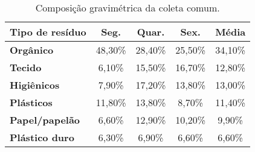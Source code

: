 \begin{table}[htbp]
\caption{Composição gravimétrica da coleta comum.}

\begin{center}
	\begin{tabular}{p{9.285em}|c|c|c|c}
	\rowcolor[rgb]{ .969,  .588,  .275} \textcolor[rgb]{ 1,  1,  1}{\textbf{Tipo de resíduo}} & \multicolumn{1}{p{4.215em}|}{\textcolor[rgb]{ 1,  1,  1}{\textbf{Seg.}}} & \multicolumn{1}{p{4.215em}|}{\textcolor[rgb]{ 1,  1,  1}{\textbf{Quar.}}} & \multicolumn{1}{p{4.215em}|}{\textcolor[rgb]{ 1,  1,  1}{\textbf{Sex.}}} & \multicolumn{1}{p{4.215em}|}{\textcolor[rgb]{ 1,  1,  1}{\textbf{Média}}} \\
	\midrule
	\rowcolor[rgb]{ .969,  .588,  .275} \textcolor[rgb]{ 1,  1,  1}{\textbf{Orgânico}} & \cellcolor[rgb]{ .984,  .831,  .706}48,30\% & \cellcolor[rgb]{ .984,  .831,  .706}28,40\% & \cellcolor[rgb]{ .984,  .831,  .706}25,50\% & \cellcolor[rgb]{ .984,  .831,  .706}34,10\% \\
	\midrule
	\rowcolor[rgb]{ .969,  .588,  .275} \textcolor[rgb]{ 1,  1,  1}{\textbf{Tecido}} & \cellcolor[rgb]{ .992,  .914,  .851}6,10\% & \cellcolor[rgb]{ .992,  .914,  .851}15,50\% & \cellcolor[rgb]{ .992,  .914,  .851}16,70\% & \cellcolor[rgb]{ .992,  .914,  .851}12,80\% \\
	\midrule
	\rowcolor[rgb]{ .969,  .588,  .275} \textcolor[rgb]{ 1,  1,  1}{\textbf{Higiênicos}} & \cellcolor[rgb]{ .984,  .831,  .706}7,90\% & \cellcolor[rgb]{ .984,  .831,  .706}17,20\% & \cellcolor[rgb]{ .984,  .831,  .706}13,80\% & \cellcolor[rgb]{ .984,  .831,  .706}13,00\% \\
	\midrule
	\rowcolor[rgb]{ .969,  .588,  .275} \textcolor[rgb]{ 1,  1,  1}{\textbf{Plásticos}} & \cellcolor[rgb]{ .992,  .914,  .851}11,80\% & \cellcolor[rgb]{ .992,  .914,  .851}13,80\% & \cellcolor[rgb]{ .992,  .914,  .851}8,70\% & \cellcolor[rgb]{ .992,  .914,  .851}11,40\% \\
	\midrule
	\rowcolor[rgb]{ .969,  .588,  .275} \textcolor[rgb]{ 1,  1,  1}{\textbf{Papel/papelão}} & \cellcolor[rgb]{ .984,  .831,  .706}6,60\% & \cellcolor[rgb]{ .984,  .831,  .706}12,90\% & \cellcolor[rgb]{ .984,  .831,  .706}10,20\% & \cellcolor[rgb]{ .984,  .831,  .706}9,90\% \\
	\midrule
	\rowcolor[rgb]{ .969,  .588,  .275} \textcolor[rgb]{ 1,  1,  1}{\textbf{Plástico duro}} & \cellcolor[rgb]{ .992,  .914,  .851}6,30\% & \cellcolor[rgb]{ .992,  .914,  .851}6,90\% & \cellcolor[rgb]{ .992,  .914,  .851}6,60\% & \cellcolor[rgb]{ .992,  .914,  .851}6,60\% \\

\end{tabular}
\end{center}
\end{table}
